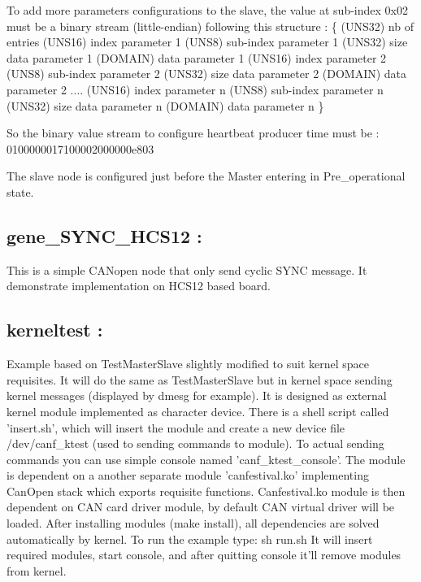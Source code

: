 \documentclass[a4paper,12pt]{book}
\newcommand{\canopen}{CANopen}
\begin{document}
{\sffamily
 To add more parameters configurations to the slave, the value at
sub{}-index 0x02 must be a binary stream (little{}-endian) following
this structure :\newline
\{
(UNS32) nb of entries\newline
(UNS16) index parameter 1\newline
(UNS8) sub{}-index parameter 1\newline
(UNS32) size data parameter 1\newline
(DOMAIN) data parameter 1\newline
(UNS16) index parameter 2\newline
(UNS8) sub{}-index parameter 2\newline
(UNS32) size data parameter 2\newline
(DOMAIN) data parameter 2\newline
\space \space \space \space \space ....\newline
(UNS16) index parameter n\newline
(UNS8) sub{}-index parameter n\newline
(UNS32) size data parameter n\newline
(DOMAIN) data parameter n\newline
\}
}

{\sffamily
 So the binary value stream to configure heartbeat producer time must be
:\newline
    0100000017100002000000e803}

{\sffamily
The slave node is configured just before the Master entering in
Pre\_operational state.}

\subsection{gene\_SYNC\_HCS12 :}
This is a simple \canopen{} node that only send cyclic SYNC message. It
demonstrate implementation on HCS12 based board.


\bigskip
\subsection{kerneltest :}

Example based on TestMasterSlave slightly modified to suit kernel space requisites. It will do the same as TestMasterSlave but in kernel space sending kernel messages (displayed by dmesg for example). It is designed as external kernel module implemented as character device. There is a shell script called 'insert.sh', which will insert the module and create a new device file /dev/canf\_ktest (used to sending commands to module). To actual sending commands you can use simple console named 'canf\_ktest\_console'.
The module is dependent on a another separate module 'canfestival.ko' implementing CanOpen stack which exports requisite functions. Canfestival.ko module is then dependent on CAN card driver module, by default CAN virtual driver will be loaded. After installing modules (make install), all dependencies are solved automatically by kernel.
To run the example type:
{\ttfamily
	sh run.sh}
It will insert required modules, start console, and after quitting console it'll remove modules from kernel.
\end{document}
